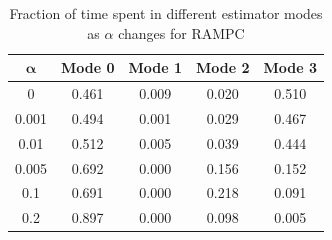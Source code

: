 \begin{table}[htb]
\begin{center}
\caption{Fraction of time spent in different estimator modes as $\alpha$ changes for RAMPC}
\label{tbl:RAMPC_ModeTime}
\begin{tabular} {|c|c|c|c|c|}
	\hline
	$\pmb{\alpha}$ & \textbf{Mode 0} & \textbf{Mode 1} & \textbf{Mode 2} & \textbf{Mode 3} \\ \hline
	0 & 0.461 & 0.009 & 0.020 & 0.510 \\ \hline
 	0.001 &  0.494 & 0.001 & 0.029 & 0.467 \\ \hline
	0.01 & 0.512 & 0.005 & 0.039 & 0.444  \\ \hline
	0.005 &  0.692 & 0.000 & 0.156 & 0.152 \\ \hline
	0.1 & 0.691 & 0.000 & 0.218 & 0.091 \\ \hline
	0.2 & 0.897 & 0.000 & 0.098 & 0.005  \\ \hline
	\end{tabular}	
	\end{center}
\end{table}

